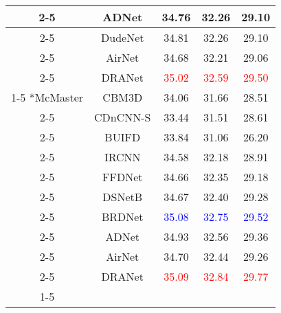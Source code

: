 \documentclass[3p,times]{elsarticle}
\begin{document}
\begin{table*}[htbp]
\begin{tabular}{ccccc}
\cline{2-5}
    & ADNet \cite{TianX2020} & 34.76 & 32.26 & 29.10 \\
\cline{2-5}
    & DudeNet \cite{Tian2021} & 34.81 & 32.26 & 29.10 \\
\cline{2-5}
    & AirNet \cite{Li2022} & 34.68 & 32.21 & 29.06\\
\cline{2-5}
    & DRANet & \textcolor{red}{35.02} & \textcolor{red}{32.59} & \textcolor{red}{29.50} \\
\cline{1-5}
\multirow{11}*{McMaster} & CBM3D \cite{Dabov2007} & 34.06 & 31.66 & 28.51 \\
\cline{2-5}
    & CDnCNN-S \cite{Zhang2017} & 33.44 & 31.51 & 28.61\\
\cline{2-5}
    & BUIFD \cite{Helou2020} & 33.84 & 31.06 & 26.20\\
\cline{2-5}
    & IRCNN \cite{ZhangZGZ2017} & 34.58 & 32.18 & 28.91\\
\cline{2-5}
    & FFDNet \cite{Zhang2018} & 34.66 & 32.35 & 29.18\\
\cline{2-5}
    & DSNetB \cite{Peng2019} & 34.67 & 32.40 & 29.28\\
\cline{2-5}
    & BRDNet \cite{Tian2020} & \textcolor{blue}{35.08} & \textcolor{blue}{32.75} & \textcolor{blue}{29.52} \\
\cline{2-5}
    & ADNet \cite{TianX2020} & 34.93 & 32.56  & 29.36 \\
\cline{2-5}
    & AirNet \cite{Li2022} & 34.70 & 32.44 & 29.26 \\
\cline{2-5}
    & DRANet & \textcolor{red}{35.09} & \textcolor{red}{32.84} & \textcolor{red}{29.77} \\
\cline{1-5}
\end{tabular}
\end{table*}
\end{document}
